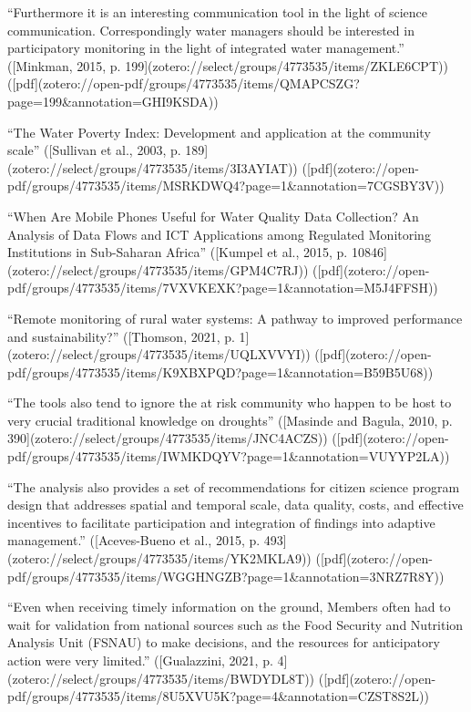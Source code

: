 “Furthermore it is an interesting communication tool in the light of science communication. Correspondingly water managers should be interested in participatory monitoring in the light of integrated water management.” ([Minkman, 2015, p. 199](zotero://select/groups/4773535/items/ZKLE6CPT)) ([pdf](zotero://open-pdf/groups/4773535/items/QMAPCSZG?page=199&annotation=GHI9KSDA))


“The Water Poverty Index: Development and application at the community scale” ([Sullivan et al., 2003, p. 189](zotero://select/groups/4773535/items/3I3AYIAT)) ([pdf](zotero://open-pdf/groups/4773535/items/MSRKDWQ4?page=1&annotation=7CGSBY3V))

“When Are Mobile Phones Useful for Water Quality Data Collection? An Analysis of Data Flows and ICT Applications among Regulated Monitoring Institutions in Sub-Saharan Africa” ([Kumpel et al., 2015, p. 10846](zotero://select/groups/4773535/items/GPM4C7RJ)) ([pdf](zotero://open-pdf/groups/4773535/items/7VXVKEXK?page=1&annotation=M5J4FFSH))

“Remote monitoring of rural water systems: A pathway to improved performance and sustainability?” ([Thomson, 2021, p. 1](zotero://select/groups/4773535/items/UQLXVVYI)) ([pdf](zotero://open-pdf/groups/4773535/items/K9XBXPQD?page=1&annotation=B59B5U68))

“The tools also tend to ignore the at risk community who happen to be host to very crucial traditional knowledge on droughts” ([Masinde and Bagula, 2010, p. 390](zotero://select/groups/4773535/items/JNC4ACZS)) ([pdf](zotero://open-pdf/groups/4773535/items/IWMKDQYV?page=1&annotation=VUYYP2LA))

“The analysis also provides a set of recommendations for citizen science program design that addresses spatial and temporal scale, data quality, costs, and effective incentives to facilitate participation and integration of findings into adaptive management.” ([Aceves-Bueno et al., 2015, p. 493](zotero://select/groups/4773535/items/YK2MKLA9)) ([pdf](zotero://open-pdf/groups/4773535/items/WGGHNGZB?page=1&annotation=3NRZ7R8Y))

“Even when receiving timely information on the ground, Members often had to wait for validation from national sources such as the Food Security and Nutrition Analysis Unit (FSNAU) to make decisions, and the resources for anticipatory action were very limited.” ([Gualazzini, 2021, p. 4](zotero://select/groups/4773535/items/BWDYDL8T)) ([pdf](zotero://open-pdf/groups/4773535/items/8U5XVU5K?page=4&annotation=CZST8S2L))



